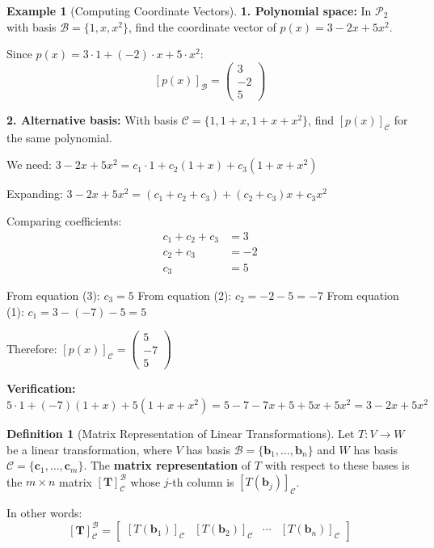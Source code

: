 \documentclass[12pt]{article}
\numberwithin{equation}{section}
\newcommand{\vect}[1]{\boldsymbol{#1}}   %
\newcommand{\mat}[1]{\mathbf{#1}}        %
\theoremstyle{plain}
\theoremstyle{definition}
\newtheorem{definition}[theorem]{Definition}
\newtheorem{example}[theorem]{Example}
\theoremstyle{remark}
\begin{document}
\begin{example}[Computing Coordinate Vectors]
\textbf{1. Polynomial space:}
In $\mathcal{P}_2$ with basis $\mathcal{B} = \{1, x, x^2\}$, find the coordinate vector of $p(x) = 3 - 2x + 5x^2$.

Since $p(x) = 3 \cdot 1 + (-2) \cdot x + 5 \cdot x^2$:
$$[p(x)]_{\mathcal{B}} = \begin{pmatrix} 3 \\ -2 \\ 5 \end{pmatrix}$$

\textbf{2. Alternative basis:}
With basis $\mathcal{C} = \{1, 1+x, 1+x+x^2\}$, find $[p(x)]_{\mathcal{C}}$ for the same polynomial.

We need: $3 - 2x + 5x^2 = c_1 \cdot 1 + c_2(1+x) + c_3(1+x+x^2)$

Expanding: $3 - 2x + 5x^2 = (c_1 + c_2 + c_3) + (c_2 + c_3)x + c_3x^2$

Comparing coefficients:
\begin{align}
c_1 + c_2 + c_3 &= 3 \\
c_2 + c_3 &= -2 \\
c_3 &= 5
\end{align}

From equation (3): $c_3 = 5$
From equation (2): $c_2 = -2 - 5 = -7$  
From equation (1): $c_1 = 3 - (-7) - 5 = 5$

Therefore: $[p(x)]_{\mathcal{C}} = \begin{pmatrix} 5 \\ -7 \\ 5 \end{pmatrix}$

\textbf{Verification:} $5 \cdot 1 + (-7)(1+x) + 5(1+x+x^2) = 5 - 7 - 7x + 5 + 5x + 5x^2 = 3 - 2x + 5x^2$ \checkmark
\end{example}

\begin{definition}[Matrix Representation of Linear Transformations]
Let $T: V \to W$ be a linear transformation, where $V$ has basis $\mathcal{B} = \{\vect{b}_1, \ldots, \vect{b}_n\}$ and $W$ has basis $\mathcal{C} = \{\vect{c}_1, \ldots, \vect{c}_m\}$. The \textbf{matrix representation} of $T$ with respect to these bases is the $m \times n$ matrix $[\mat{T}]_{\mathcal{C}}^{\mathcal{B}}$ whose $j$-th column is $[T(\vect{b}_j)]_{\mathcal{C}}$.

In other words:
$$[\mat{T}]_{\mathcal{C}}^{\mathcal{B}} = \begin{bmatrix} [T(\vect{b}_1)]_{\mathcal{C}} & [T(\vect{b}_2)]_{\mathcal{C}} & \cdots & [T(\vect{b}_n)]_{\mathcal{C}} \end{bmatrix}$$
\end{definition}
\end{document}
